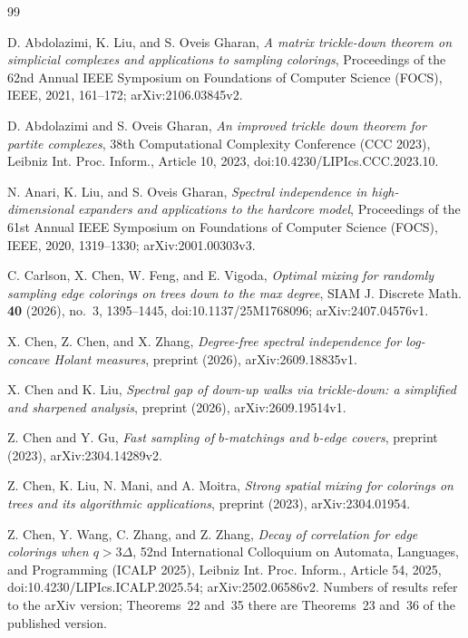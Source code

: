 \documentclass{amsart}
\numberwithin{equation}{section}
\theoremstyle{plain}
\theoremstyle{definition}
\theoremstyle{remark}
\begin{document}
\begin{thebibliography}{99}

D. Abdolazimi, K. Liu, and S. Oveis Gharan, \emph{A matrix trickle-down theorem on simplicial complexes and applications to sampling colorings}, Proceedings of the 62nd Annual IEEE Symposium on Foundations of Computer Science (FOCS), IEEE, 2021, 161--172; arXiv:2106.03845v2.

D. Abdolazimi and S. Oveis Gharan, \emph{An improved trickle down theorem for partite complexes}, 38th Computational Complexity Conference (CCC 2023), Leibniz Int. Proc. Inform., Article 10, 2023, doi:10.4230/LIPIcs.CCC.2023.10.

N. Anari, K. Liu, and S. Oveis Gharan, \emph{Spectral independence in high-dimensional expanders and applications to the hardcore model}, Proceedings of the 61st Annual IEEE Symposium on Foundations of Computer Science (FOCS), IEEE, 2020, 1319--1330; arXiv:2001.00303v3.

C. Carlson, X. Chen, W. Feng, and E. Vigoda, \emph{Optimal mixing for randomly sampling edge colorings on trees down to the max degree}, SIAM J. Discrete Math. \textbf{40} (2026), no.~3, 1395--1445, doi:10.1137/25M1768096; arXiv:2407.04576v1.

X. Chen, Z. Chen, and X. Zhang, \emph{Degree-free spectral independence for log-concave Holant measures}, preprint (2026), arXiv:2609.18835v1.

X. Chen and K. Liu, \emph{Spectral gap of down-up walks via trickle-down: a simplified and sharpened analysis}, preprint (2026), arXiv:2609.19514v1.

Z. Chen and Y. Gu, \emph{Fast sampling of $b$-matchings and $b$-edge covers}, preprint (2023), arXiv:2304.14289v2.

Z. Chen, K. Liu, N. Mani, and A. Moitra, \emph{Strong spatial mixing for colorings on trees and its algorithmic applications}, preprint (2023), arXiv:2304.01954.

Z. Chen, Y. Wang, C. Zhang, and Z. Zhang, \emph{Decay of correlation for edge colorings when $q>3\Delta$}, 52nd International Colloquium on Automata, Languages, and Programming (ICALP 2025), Leibniz Int. Proc. Inform., Article 54, 2025, doi:10.4230/LIPIcs.ICALP.2025.54; arXiv:2502.06586v2. Numbers of results refer to the arXiv version; Theorems~22 and~35 there are Theorems~23 and~36 of the published version.


\end{thebibliography}
\end{document}
